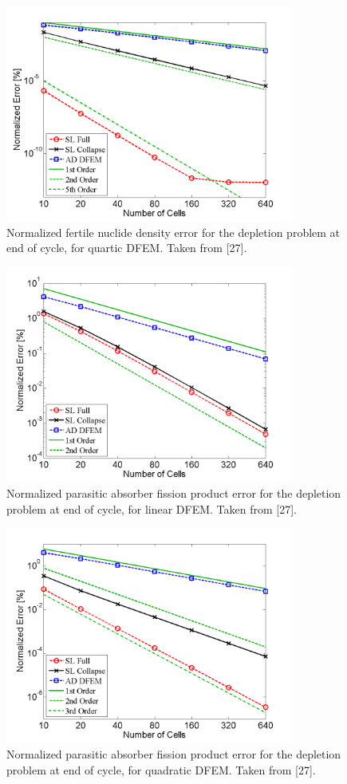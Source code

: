 \begin{figure}[!hbp]
\centering
\includegraphics[width=9.5cm]{chapter5_depletion/ft_P4_norm_err.png}
\caption{Normalized fertile nuclide density error for the depletion problem at end of cycle, for quartic DFEM.  Taken from [27].}
\label{fig:depletion_NFT_p4}
\end{figure}

\newpage

\begin{figure}[!htp]
\centering
\includegraphics[width=9.5cm]{chapter5_depletion/FPA_P1_norm_err.png}
\caption{Normalized parasitic absorber fission product error for the depletion problem at end of cycle, for linear DFEM.  Taken from [27].}
\label{fig:depletion_NFPA_p1}
\end{figure}
%
\begin{figure}[!hbp]
\centering
\includegraphics[width=9.5cm]{chapter5_depletion/FPA_P2_norm_err.png}
\caption{Normalized parasitic absorber fission product error for the depletion problem at end of cycle, for quadratic DFEM.  Taken from [27].}
\label{fig:depletion_NFPA_p2}
\end{figure}

